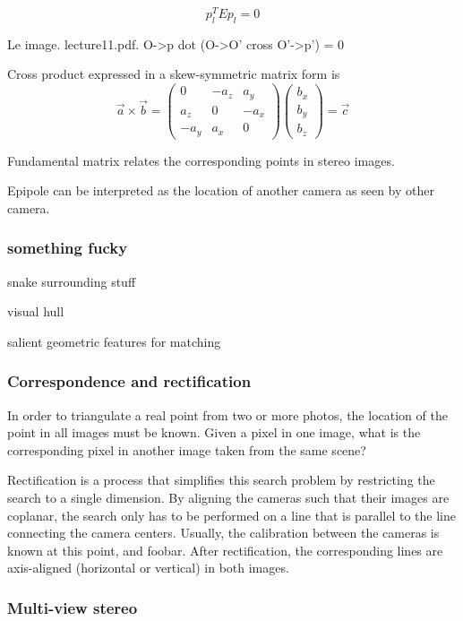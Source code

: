 \[
	p_l^T E p_l = 0
\]

Le image. lecture11.pdf. O->p dot (O->O' cross O'->p') = 0

Cross product expressed in a skew-symmetric matrix form is
\begin{equation}
\vec a \times \vec b =
\begin{pmatrix}
	 0   & -a_z &  a_y\\
	 a_z &  0   & -a_x\\
	-a_y &  a_x & 0
\end{pmatrix}
\begin{pmatrix}
	b_x\\b_y\\b_z
\end{pmatrix}
= \vec c
\end{equation}


Fundamental matrix relates the corresponding points in stereo images.

Epipole can be interpreted as the location of another camera as seen by other camera.

\subsubsection{something fucky}

snake surrounding stuff

visual hull

salient geometric features for matching

\subsubsection{Correspondence and rectification}

In order to triangulate a real point from two or more photos, the location of the point in all images must be known.
Given a pixel in one image, what is the corresponding pixel in another image taken from the same scene?

Rectification is a process that simplifies this search problem by restricting the search to a single dimension.
By aligning the cameras such that their images are coplanar, the search only has to be performed on a line that is parallel to the line connecting the camera centers.
Usually, the calibration between the cameras is known at this point, and foobar.
After rectification, the corresponding lines are axis-aligned (horizontal or vertical) in both images.



\subsubsection{Multi-view stereo}

